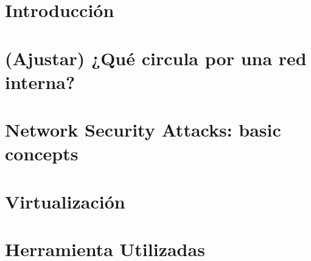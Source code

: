 \documentclass[12pt,twoside]{book}
\begin{document}
\nocite{*}

\frontmatter\pagestyle{empty}

\begin{titlepage}

\end{titlepage}

\begin{titlepage}

\end{titlepage}






\tableofcontents


\mainmatter\pagestyle{headings}


\chapter{Introducci\'on} 
    \label{capIntro}








\chapter{(Ajustar) ¿Qué circula por una red interna? } 
    \label{capImp}


\chapter{Network Security Attacks: basic concepts} 
    \label{capDesc}


\chapter{Virtualización} 
    \label{capVirtu}



\chapter{Herramienta Utilizadas} 
    \label{capTools}

\end{document}
